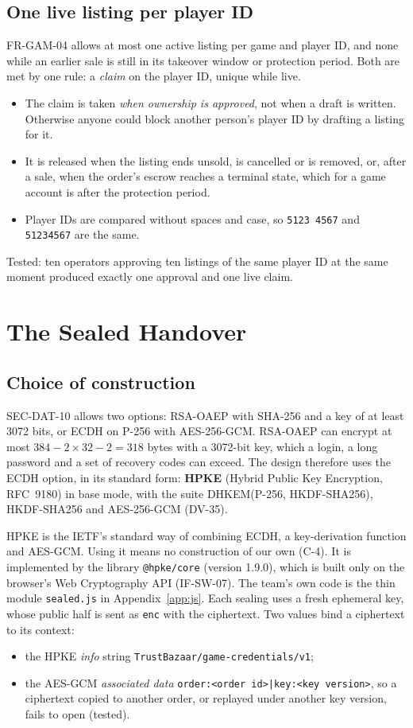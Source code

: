 \documentclass[11pt,a4paper]{article}
\begin{document}
\subsection{One live listing per player ID}
FR-GAM-04 allows at most one active listing per game and player ID, and none while an earlier sale is still in its takeover window or protection period. Both are met by one rule: a \emph{claim} on the player ID, unique while live.
\begin{itemize}[nosep]
  \item The claim is taken \emph{when ownership is approved}, not when a draft is written. Otherwise anyone could block another person's player ID by drafting a listing for it.
  \item It is released when the listing ends unsold, is cancelled or is removed, or, after a sale, when the order's escrow reaches a terminal state, which for a game account is after the protection period.
  \item Player IDs are compared without spaces and case, so \texttt{5123 4567} and \texttt{51234567} are the same.
\end{itemize}
Tested: ten operators approving ten listings of the same player ID at the same moment produced exactly one approval and one live claim.
\section{The Sealed Handover}
\label{sec:sealed}

\subsection{Choice of construction}
SEC-DAT-10 allows two options: RSA-OAEP with SHA-256 and a key of at least 3072 bits, or ECDH on P-256 with AES-256-GCM. RSA-OAEP can encrypt at most $384 - 2 \times 32 - 2 = 318$ bytes with a 3072-bit key, which a login, a long password and a set of recovery codes can exceed. The design therefore uses the ECDH option, in its standard form: \textbf{HPKE} (Hybrid Public Key Encryption, RFC~9180) in base mode, with the suite DHKEM(P-256, HKDF-SHA256), HKDF-SHA256 and AES-256-GCM (DV-35).

HPKE is the IETF's standard way of combining ECDH, a key-derivation function and AES-GCM. Using it means no construction of our own (C-4). It is implemented by the library \texttt{@hpke/core} (version 1.9.0), which is built only on the browser's Web Cryptography API (IF-SW-07). The team's own code is the thin module \texttt{sealed.js} in Appendix~\ref{app:js}. Each sealing uses a fresh ephemeral key, whose public half is sent as \texttt{enc} with the ciphertext. Two values bind a ciphertext to its context:
\begin{itemize}[nosep]
  \item the HPKE \emph{info} string \texttt{TrustBazaar/game-credentials/v1};
  \item the AES-GCM \emph{associated data} \texttt{order:<order id>|key:<key version>}, so a ciphertext copied to another order, or replayed under another key version, fails to open (tested).
\end{itemize}
\end{document}
